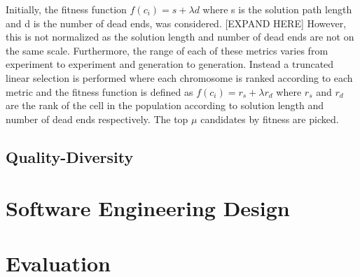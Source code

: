 Initially, the fitness function $f(c_i) = s + \lambda d$ where s is the solution path length and d is the number of dead ends, was considered. 
[EXPAND HERE]
However, this is not normalized as the solution length and number of dead ends are not on the same scale. Furthermore, the range of each of these metrics varies from experiment to experiment and generation to generation. Instead a truncated linear selection is performed where each chromosome is ranked according to each metric and the fitness function is defined as $f(c_i) = r_s + \lambda r_d$ where $r_s$ and $r_d$ are the rank of the cell in the population according to solution length and number of dead ends respectively. The top $\mu$ candidates by fitness are picked.

\subsection{Quality-Diversity}

\section{Software Engineering Design}

\section{Evaluation} \label{sec:lifelike-evaluation}